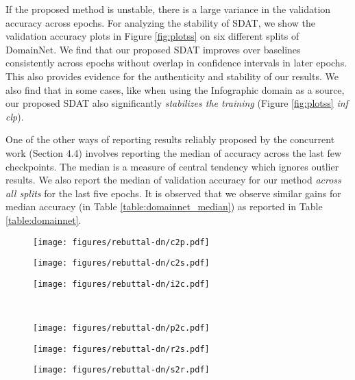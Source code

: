 \documentclass[table,dvipsnames]{article}
\theoremstyle{plain}
\theoremstyle{definition}
\theoremstyle{remark}
\begin{document}
If the proposed method is unstable, there is a large variance in the validation accuracy across epochs. For analyzing the stability of SDAT, we show the validation accuracy plots in Figure \ref{fig:plotss}  on six different splits of DomainNet. We find that our proposed SDAT improves over baselines consistently across epochs without overlap in confidence intervals in later epochs. This also provides evidence for the authenticity and stability of our results.  We also find that in some cases, like when using the Infographic domain as a source, our proposed SDAT also significantly \textit{stabilizes the training} (Figure \ref{fig:plotss} \textit{inf}  \textit{clp}).

One of the other ways of reporting results reliably proposed by the concurrent work \citep{berthelot2021adamatch} (Section 4.4) involves reporting the median of accuracy across the last few checkpoints. The median is a measure of central tendency which ignores outlier results. We also report the median of validation accuracy for our method \emph{across all splits} for the last five epochs. It is observed that we observe similar gains for median accuracy (in Table \ref{table:domainnet_median}) as reported in Table \ref{table:domainnet}.
\begin{figure*}[t!]
    \centering
    \begin{subfigure}[b]{0.3\linewidth}
  \centering
  \texttt{[image: figures/rebuttal-dn/c2p.pdf]}
  \label{fig:c2p}
\end{subfigure}
\begin{subfigure}[b]{0.3\linewidth}
  \centering
  \texttt{[image: figures/rebuttal-dn/c2s.pdf]}
  \label{fig:c2s}
\end{subfigure}
\begin{subfigure}[b]{0.3\linewidth}
  \centering
  \texttt{[image: figures/rebuttal-dn/i2c.pdf]}
  \label{fig:i2c}
\end{subfigure}\\
    \begin{subfigure}[b]{0.3\linewidth}
  \centering
  \texttt{[image: figures/rebuttal-dn/p2c.pdf]}
  \label{fig:p2c}
\end{subfigure}
\begin{subfigure}[b]{0.3\linewidth}
  \centering
  \texttt{[image: figures/rebuttal-dn/r2s.pdf]}
  \label{fig:r2s}
\end{subfigure}
\begin{subfigure}[b]{0.3\linewidth}
  \centering
  \texttt{[image: figures/rebuttal-dn/s2r.pdf]}
  \label{fig:s2r}
\end{subfigure}
\caption{{Validation Accuracy across epochs on different splits of DomainNet. We run on three different random seeds and plot the error bar indicating standard deviation across runs. CDAN w/ SDAT consistently outperforms CDAN across different splits of DomainNet.}}
\label{fig:plotss}

\end{figure*}
\end{document}
